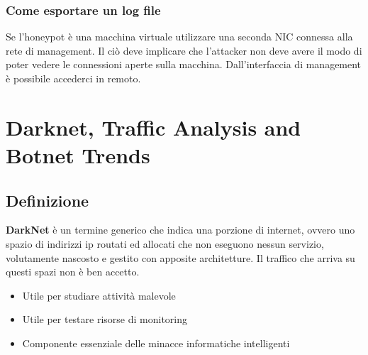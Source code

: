 \documentclass[8pt]{extarticle}
\begin{document}
\subsubsection{Come esportare un log file}
Se l’honeypot è una macchina virtuale utilizzare una seconda NIC connessa alla rete di management. Il ciò deve implicare che l’attacker 
non deve avere il modo di poter vedere le connessioni aperte sulla macchina. Dall’interfaccia di management è possibile accederci in remoto.
\section{Darknet, Traffic Analysis and Botnet Trends}
\subsection{Definizione}
\textbf{DarkNet} è un termine generico che indica una porzione di internet, ovvero uno spazio di indirizzi ip routati ed allocati che non 
eseguono nessun servizio, volutamente nascosto e gestito con apposite architetture. Il traffico che arriva su questi spazi non è ben accetto.
\begin{itemize}
    \item Utile per studiare attività malevole
    \item Utile per testare risorse di monitoring
    \item Componente essenziale delle minacce informatiche intelligenti 
\end{itemize}
\end{document}
